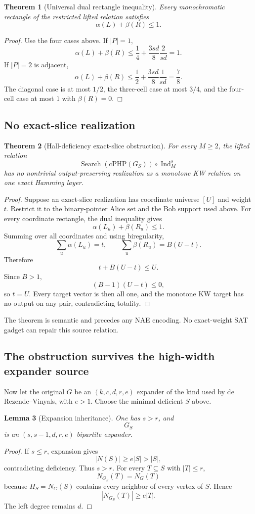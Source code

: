 \documentclass[11pt]{article}
\newtheorem{theorem}{Theorem}
\newtheorem{lemma}[theorem]{Lemma}
\begin{document}
\begin{theorem}[Universal dual rectangle inequality]
Every monochromatic rectangle of the restricted lifted relation satisfies
\[
\boxed{\alpha(L)+\beta(R)\le1.}
\]
\end{theorem}
\begin{proof}
Use the four cases above. If $|P|=1$,
\[
\alpha(L)+\beta(R)
\le
\frac14+\frac{3sd}{8}\frac{2}{sd}=1.
\]
If $|P|=2$ is adjacent,
\[
\alpha(L)+\beta(R)
\le
\frac12+\frac{3sd}{8}\frac1{sd}
=
\frac78.
\]
The diagonal case is at most $1/2$, the three-cell case at most $3/4$, and the four-cell case at most $1$ with $\beta(R)=0$.
\end{proof}

\subsection{No exact-slice realization}
\begin{theorem}[Hall-deficiency exact-slice obstruction]
For every $M\ge2$, the lifted relation
\[
\boxed{
\operatorname{Search}(\mathrm{cPHP}(G_S))
\circ\operatorname{Ind}_M^s
}
\]
has no nontrivial output-preserving realization as a monotone KW relation on one exact Hamming layer.
\end{theorem}
\begin{proof}
Suppose an exact-slice realization has coordinate universe $[U]$ and weight $t$. Restrict it to the binary-pointer Alice set and the Bob support used above. For every coordinate rectangle, the dual inequality gives
\[
\alpha(L_u)+\beta(R_u)\le1.
\]
Summing over all coordinates and using biregularity,
\[
\sum_u\alpha(L_u)=t,
\qquad
\sum_u\beta(R_u)=B(U-t).
\]
Therefore
\[
t+B(U-t)\le U.
\]
Since $B>1$,
\[
(B-1)(U-t)\le0,
\]
so $t=U$. Every target vector is then all one, and the monotone KW target has no output on any pair, contradicting totality.
\end{proof}

The theorem is semantic and precedes any NAE encoding. No exact-weight SAT gadget can repair this source relation.

\subsection{The obstruction survives the high-width expander source}
Now let the original $G$ be an $(k,c,d,r,e)$ expander of the kind used by de Rezende--Vinyals, with $e>1$. Choose the minimal deficient $S$ above.

\begin{lemma}[Expansion inheritance]
One has $s>r$, and
\[
G_S
\]
is an $(s,s-1,d,r,e)$ bipartite expander.
\end{lemma}
\begin{proof}
If $s\le r$, expansion gives
\[
|N(S)|\ge e|S|>|S|,
\]
contradicting deficiency. Thus $s>r$. For every $T\subseteq S$ with $|T|\le r$,
\[
N_{G_S}(T)=N_G(T)
\]
because $H_S=N_G(S)$ contains every neighbor of every vertex of $S$. Hence
\[
|N_{G_S}(T)|\ge e|T|.
\]
The left degree remains $d$.
\end{proof}
\end{document}
